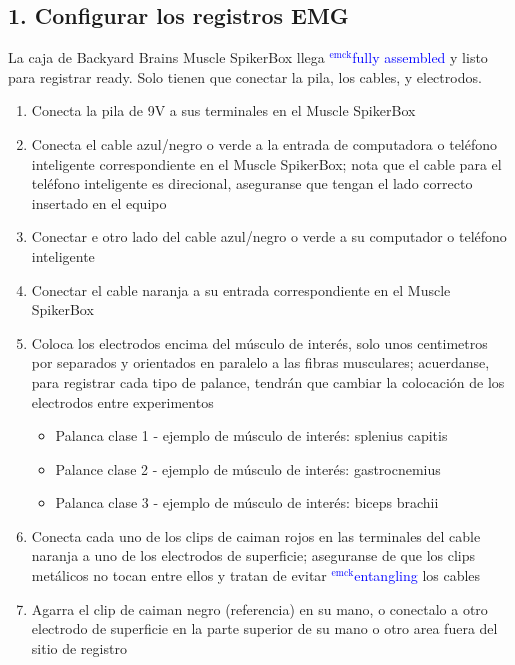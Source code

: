 \documentclass[12pt]{article}
\newcommand{\emck}[1]{\textcolor{blue}{$^{\textrm{emck}}${#1}}}
\begin{document}
\subsection*{1. Configurar los registros EMG}

La caja de Backyard Brains Muscle SpikerBox llega \emck{fully
  assembled} y listo para registrar ready. Solo tienen que conectar la
pila, los cables, y electrodos.

\vspace{0.2cm}

\begin{enumerate}
\item Conecta la pila de 9V a sus terminales en el Muscle SpikerBox
\item Conecta el cable azul/negro o verde a la entrada de computadora
  o teléfono inteligente correspondiente en el Muscle SpikerBox; nota
  que el cable para el teléfono inteligente es direcional, aseguranse
  que tengan el lado correcto insertado en el equipo
\item Conectar e otro lado del cable azul/negro o verde a su
  computador o teléfono inteligente
\item Conectar el cable naranja a su entrada correspondiente en el
  Muscle SpikerBox
\item Coloca los electrodos encima del músculo de interés, solo unos
  centimetros por separados y orientados en paralelo a las fibras
  musculares; acuerdanse, para registrar cada tipo de palance, tendrán
  que cambiar la colocación de los electrodos entre experimentos
\begin{itemize}
\item Palanca clase 1 - ejemplo de músculo de interés: splenius capitis
\item Palance clase 2 -  ejemplo de músculo de interés: gastrocnemius
\item Palanca clase 3 -  ejemplo de músculo de interés: biceps brachii
\end{itemize}
\item Conecta cada uno de los clips de caiman rojos en las terminales
  del cable naranja a uno de los electrodos de superficie; aseguranse
  de que los clips metálicos no tocan entre ellos y tratan de evitar
  \emck{entangling} los cables
\item Agarra el clip de caiman negro (referencia) en su mano, o
  conectalo a otro electrodo de superficie en la parte superior de su
  mano o otro area fuera del sitio de registro

\vspace{0.2cm}


\end{enumerate}
\end{document}
